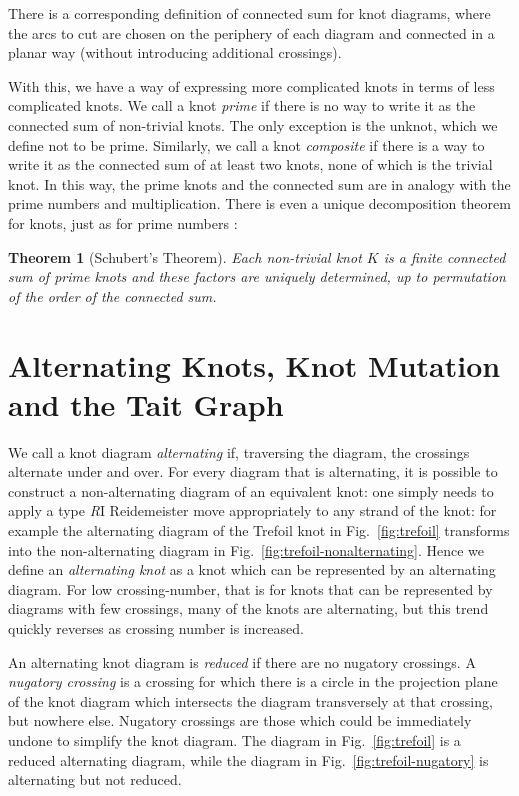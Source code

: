 \documentclass[12pt]{report}
\newtheorem*{theorem}{Theorem}
\begin{document}
There is a corresponding definition of connected sum for knot diagrams, where the arcs to cut are chosen on the periphery of each diagram and connected in a planar way (without introducing additional crossings).

With this, we have a way of expressing more complicated knots in terms of less complicated knots. We call a knot \textit{prime} if there is no way to write it as the connected sum of non-trivial knots. The only exception is the unknot, which we define not to be prime.  Similarly, we call a knot \textit{composite} if there is a way to write it as the connected sum of at least two knots, none of which is the trivial knot. In this way, the prime knots and the connected sum are in analogy with the prime numbers and multiplication. There is even a unique decomposition theorem for knots, just as for prime numbers \cite[Thoerem 7.12]{knots}:

\begin{theorem}[Schubert's Theorem]
	Each non-trivial knot $K$ is a finite connected sum of prime knots and these factors are uniquely determined, up to permutation of the order of the connected sum. 
\end{theorem}

\section{Alternating Knots, Knot Mutation and the Tait Graph}
We call a knot diagram \textit{alternating} if, traversing the diagram, the crossings alternate under and over. For every diagram that is alternating, it is possible to construct a non-alternating diagram of an equivalent knot: one simply needs to apply a type \textit{R}I Reidemeister move appropriately to any strand of the knot: for example the alternating diagram of the Trefoil knot in Fig.~\ref{fig:trefoil} transforms into the non-alternating diagram in Fig.~\ref{fig:trefoil-nonalternating}. Hence we define an \textit{alternating knot} as a knot which can be represented by an alternating diagram. For low crossing-number, that is for knots that can be represented by diagrams with few crossings, many of the knots are alternating, but this trend quickly reverses as crossing number is increased.

An alternating knot diagram is \textit{reduced} if there are no nugatory crossings. A \textit{nugatory crossing} is a crossing for which there is a circle in the projection plane of the knot diagram which intersects the diagram transversely at that crossing, but nowhere else. Nugatory crossings are those which could be immediately undone to simplify the knot diagram. The diagram in Fig.~\ref{fig:trefoil} is a reduced alternating diagram, while the diagram in Fig.~\ref{fig:trefoil-nugatory} is alternating but not reduced.
\end{document}
